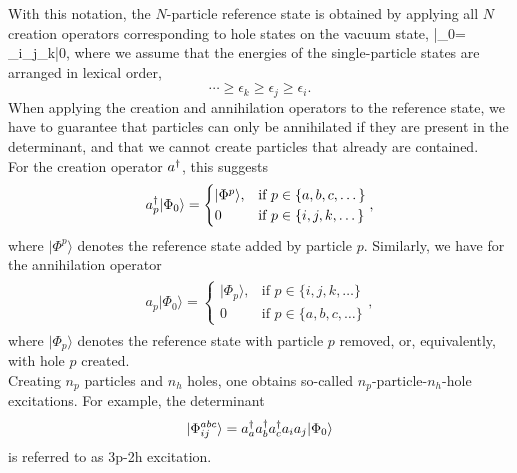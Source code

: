 With this notation, the $N$-particle reference state is obtained by applying all $N$ creation operators corresponding to hole states on the vacuum state,
\be 
|\Phi_0\rangle = \ad_i\ad_j\ad_k\cdots|0\rangle,
\ee 
where we assume that the energies of the single-particle states are arranged in lexical order,
\[
\cdots \geq \epsilon_k \geq \epsilon_j \geq \epsilon_i.
\]
When applying the creation and annihilation operators to the reference state, we have to guarantee that particles can only be annihilated if they are present in the determinant, and that we cannot create particles that already are contained.\\
For the creation operator $a^{\dagger}$, this suggests
\begin{align}
\begin{split}
a^{\dagger}_p |\Phi_0\rangle = \begin{cases}
|\Phi^p\rangle, &\text{if } p \in \lbrace a,b,c,\dots\rbrace\\
0 & \text{if } p \in \lbrace i,j,k,\dots\rbrace
\end{cases},
\end{split}
\end{align}
where $|\Phi^p\rangle$ denotes the reference state added by particle $p$. Similarly, we have for the annihilation operator
\begin{align}
\begin{split}
a_p|\Phi_0\rangle = \begin{cases}
|\Phi_p\rangle, &\text{if } p \in \lbrace i,j,k,\dots\rbrace\\
0 & \text{if } p \in \lbrace a,b,c,\dots\rbrace
\end{cases},
\end{split}
\end{align}
where $|\Phi_p\rangle$ denotes the reference state with particle $p$  removed, or, equivalently, with hole $p$ created.\\
Creating $n_p$ particles and  $n_h$ holes, one obtains so-called $n_p$-particle-$n_h$-hole excitations. For example, the determinant
\[
|\Phi_{ij}^{abc}\rangle = a^{\dagger}_aa^{\dagger}_ba^{\dagger}_c a_i a_j |\Phi_0\rangle
\]
is referred to as 3p-2h excitation.

